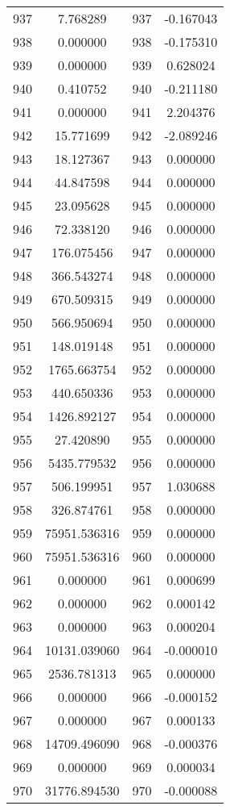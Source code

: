 \documentclass[12pt]{article}
\begin{document}
\begin{longtable}{@{}cccc@{}}
937 & 7.768289 & 937 & -0.167043 \\
938 & 0.000000 & 938 & -0.175310 \\
939 & 0.000000 & 939 & 0.628024 \\
940 & 0.410752 & 940 & -0.211180 \\
941 & 0.000000 & 941 & 2.204376 \\
942 & 15.771699 & 942 & -2.089246 \\
943 & 18.127367 & 943 & 0.000000 \\
944 & 44.847598 & 944 & 0.000000 \\
945 & 23.095628 & 945 & 0.000000 \\
946 & 72.338120 & 946 & 0.000000 \\
947 & 176.075456 & 947 & 0.000000 \\
948 & 366.543274 & 948 & 0.000000 \\
949 & 670.509315 & 949 & 0.000000 \\
950 & 566.950694 & 950 & 0.000000 \\
951 & 148.019148 & 951 & 0.000000 \\
952 & 1765.663754 & 952 & 0.000000 \\
953 & 440.650336 & 953 & 0.000000 \\
954 & 1426.892127 & 954 & 0.000000 \\
955 & 27.420890 & 955 & 0.000000 \\
956 & 5435.779532 & 956 & 0.000000 \\
957 & 506.199951 & 957 & 1.030688 \\
958 & 326.874761 & 958 & 0.000000 \\
959 & 75951.536316 & 959 & 0.000000 \\
960 & 75951.536316 & 960 & 0.000000 \\
961 & 0.000000 & 961 & 0.000699 \\
962 & 0.000000 & 962 & 0.000142 \\
963 & 0.000000 & 963 & 0.000204 \\
964 & 10131.039060 & 964 & -0.000010 \\
965 & 2536.781313 & 965 & 0.000000 \\
966 & 0.000000 & 966 & -0.000152 \\
967 & 0.000000 & 967 & 0.000133 \\
968 & 14709.496090 & 968 & -0.000376 \\
969 & 0.000000 & 969 & 0.000034 \\
970 & 31776.894530 & 970 & -0.000088 \\

\end{longtable}
\end{document}
